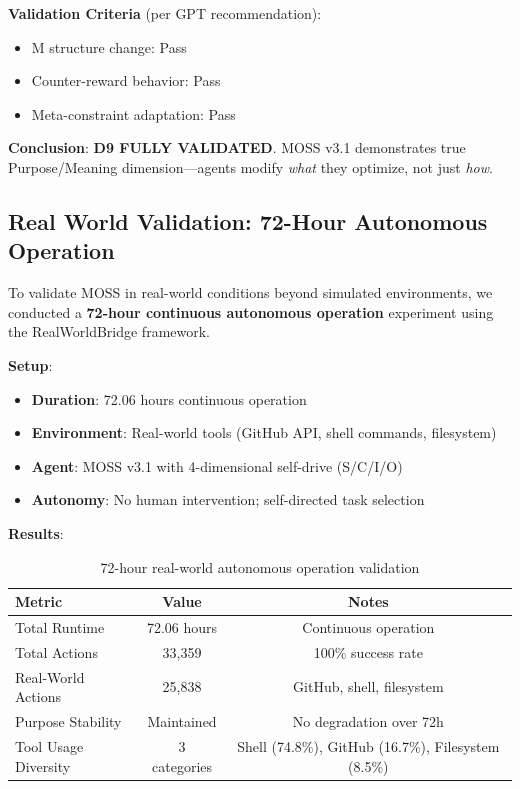 \documentclass{article}
\begin{document}
\textbf{Validation Criteria} (per GPT recommendation):
\begin{itemize}
    \item M structure change:  Pass
    \item Counter-reward behavior:  Pass
    \item Meta-constraint adaptation:  Pass
\end{itemize}

\textbf{Conclusion}: \textbf{D9 FULLY VALIDATED}. MOSS v3.1 demonstrates true Purpose/Meaning dimension—agents modify \textit{what} they optimize, not just \textit{how}.

\subsection{Real World Validation: 72-Hour Autonomous Operation}

To validate MOSS in real-world conditions beyond simulated environments, we conducted a \textbf{72-hour continuous autonomous operation} experiment using the RealWorldBridge framework.

\textbf{Setup}:
\begin{itemize}
    \item \textbf{Duration}: 72.06 hours continuous operation
    \item \textbf{Environment}: Real-world tools (GitHub API, shell commands, filesystem)
    \item \textbf{Agent}: MOSS v3.1 with 4-dimensional self-drive (S/C/I/O)
    \item \textbf{Autonomy}: No human intervention; self-directed task selection
\end{itemize}

\textbf{Results}:

\begin{table}[h]
\centering
\begin{tabular}{lcc}
\toprule
\textbf{Metric} & \textbf{Value} & \textbf{Notes} \\
\midrule
Total Runtime & 72.06 hours & Continuous operation \\
Total Actions & 33,359 & 100\% success rate \\
Real-World Actions & 25,838 & GitHub, shell, filesystem \\
Purpose Stability & Maintained & No degradation over 72h \\
Tool Usage Diversity & 3 categories & Shell (74.8\%), GitHub (16.7\%), Filesystem (8.5\%) \\
\bottomrule
\end{tabular}
\caption{72-hour real-world autonomous operation validation}
\end{table}
\end{document}
